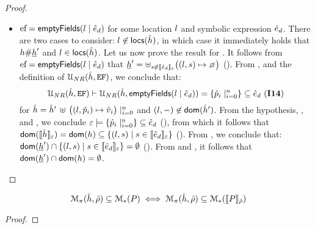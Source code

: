 \begin{proof}
\begin{itemize}
  \item $\mathtt{\text{ef}} = \mathsf{emptyFields}(l \mid \hat{e}_d)$ for some location $l$ and symbolic expression $\hat{e}_d$. 
           There are two cases to consider:  $l \not\in {\sf locs}(\hat{h})$, in which case 
	    it immediately holds that $h \# \underline{h}'$ and  $l \in {\sf locs}(\hat{h})$. 
	    Let us now prove the result for . 
	    It follows from $\mathtt{\text{ef}} = \mathsf{emptyFields}(l \mid \hat{e}_d)$ that $\iheap' = \uplus_{\jstring \not\in \symbeval{\sexpr_d}{\senv}}\big((\loc, \jstring) \mapsto \none\big)$ (). 
            From , and the definition of ${\cal U}_{NR}(\hat{h}, \mathtt{EF})$, 
	    we conclude that: 
	    $$
	       {\cal U}_{NR}(\hat{h}, \mathtt{EF}) \vdash {\cal U}_{NR}(\hat{h}, \mathsf{emptyFields}(l \mid \hat{e}_d)) =  \{ \hat{p}_i \mid_{i = 0}^n \} \subseteq \hat{e}_d \text{ ({\bf I14})} 
	    $$
	    for $\hat{h} = \hat{h}' \, \uplus \,  \big((l, \hat{p}_i) \mapsto \hat{v}_i\big)\mid_{i = 0}^n$ and $(l, -) \not\in \mathsf{dom}(\hat{h}')$. 
	    From the hypothesis, , and , we conclude $\varepsilon \models \{ \hat{p}_i \mid_{i = 0}^n \} \subseteq \hat{e}_d$ (), 
	    from which it follows that $\mathsf{dom}(\llbracket \hat{h} \rrbracket_{\varepsilon}) = \mathsf{dom}(h) \subseteq \{ (l, s) \mid s \in \llbracket \hat{e}_d \rrbracket_{\varepsilon} \}$ (). 
	    From , we conclude that: $\mathsf{dom}(\underline{h}') \cap \{ (l, s) \mid s \in  \llbracket \hat{e}_d \rrbracket_{\varepsilon} \} = \emptyset$ ().
	    From  and , it follows that $\mathsf{dom}(\underline{h}') \cap \mathsf{dom}(h) = \emptyset$. 
\end{itemize}
\end{proof}


\begin{lemma}\label{lemma:symb:store}
$$
\mathcal{M}_{\pi}(\hat{h}, \hat\rho) \subseteq \mathcal{M}_{*}(P) 
    \iff 
    \mathcal{M}_{\pi}(\hat{h}, \hat\rho) \subseteq \mathcal{M}_{*}(\llbracket P \rrbracket_{\hat\rho}) 
$$
\end{lemma}
\begin{proof}
\end{proof}



